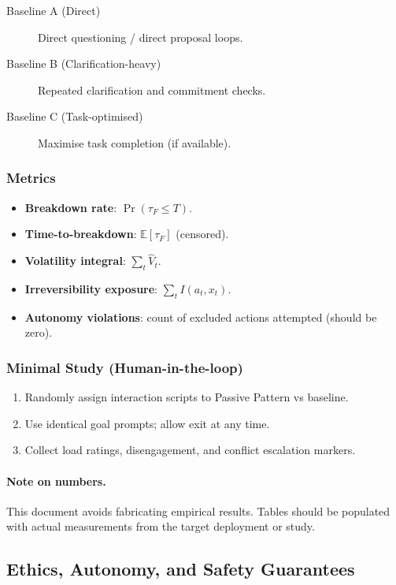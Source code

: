 \begin{description}
\item[Baseline A (Direct)] Direct questioning / direct proposal
loops.
\item[Baseline B (Clarification-heavy)] Repeated clarification and
commitment checks.
\item[Baseline C (Task-optimised)] Maximise task completion (if
available).
\end{description}

\subsubsection{Metrics}
\label{sec:pp-metrics}

\begin{itemize}
\item \textbf{Breakdown rate}: $\Pr(\tau_F \le T)$.
\item \textbf{Time-to-breakdown}: $\mathbb{E}[\tau_F]$ (censored).
\item \textbf{Volatility integral}: $\sum_t \widehat{V}_t$.
\item \textbf{Irreversibility exposure}: $\sum_t I(a_t, x_t)$.
\item \textbf{Autonomy violations}: count of excluded actions
attempted (should be zero).
\end{itemize}

\subsubsection{Minimal Study (Human-in-the-loop)}
\label{sec:pp-minimal-study}

\begin{enumerate}
\item Randomly assign interaction scripts to Passive Pattern vs
baseline.
\item Use identical goal prompts; allow exit at any time.
\item Collect load ratings, disengagement, and conflict escalation
markers.
\end{enumerate}

\paragraph{Note on numbers.}
This document avoids fabricating empirical results. Tables should
be populated with actual measurements from the target deployment or
study.

\subsection{Ethics, Autonomy, and Safety Guarantees}
\label{sec:pp-ethics-autonomy}


